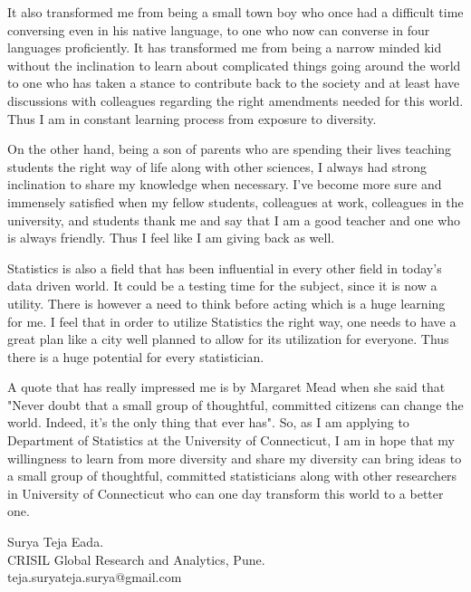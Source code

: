 It also transformed me from being a small town boy who once had a difficult time conversing even in his native language, to one who now can converse in four languages proficiently. It has transformed me from being a narrow minded kid without the inclination to learn about complicated things going around the world to one who has taken a stance to contribute back to the society and at least have discussions with colleagues regarding the right amendments needed for this world.  Thus I am in constant learning process from exposure to diversity.  
 
On the other hand, being a son of parents who are spending their lives teaching students the right way of life along with other sciences, I always had strong inclination to share my knowledge when necessary. I've become more sure and immensely satisfied when my fellow students, colleagues at work, colleagues in the university, and students thank me and say that I am a good teacher and one who is always friendly. Thus I feel like I am giving back as well. 

Statistics is also a field that has been influential in every other field in today's data driven world. It could be a testing time for the subject, since it is now a utility. There is however a need to think before acting which is a huge learning for me. I feel that in order to utilize Statistics the right way, one needs to have a great plan like a city well planned to allow for its utilization for everyone. Thus there is a huge potential for every statistician.

A quote that has really impressed me is by Margaret Mead when she said that "Never doubt that a small group of thoughtful, committed citizens can change the world. Indeed, it's the only thing that ever has". So, as I am applying to Department of Statistics at the University of Connecticut, I am in hope that my willingness to learn from more diversity and share my diversity can bring ideas to a small group of thoughtful, committed statisticians along with other researchers in University of Connecticut who can one day transform this world to a better one. 





 



\begin{flushleft}

Surya Teja Eada.\\
CRISIL Global Research and Analytics, Pune.\\
teja.suryateja.surya@gmail.com

\end{flushleft}


